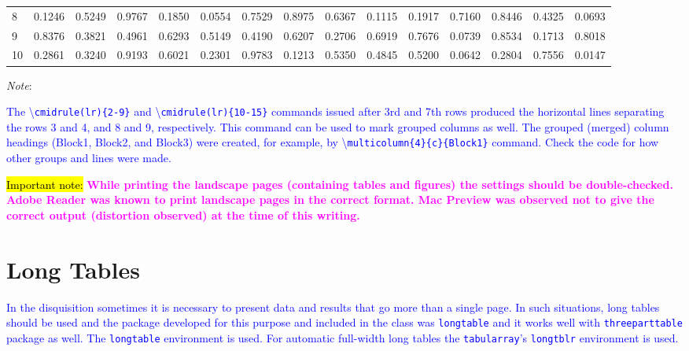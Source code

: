 \documentclass[phd]{ndsu-thesis-2022}
\newcommand\italk[1]{\textcolor{blue}{#1}}  %
\newcommand\cmd[1]{\textbackslash\texttt{#1}}  %
\newcommand\vb[1]{\textcolor{blue}{\texttt{#1}}}%
\begin{document}
\begin{landscape}
\begin{table}[p]
{\begin{tabular}{l  rrrr  cccc  llll  rr}
8 & 0.1246 & 0.5249 & 0.9767 & 0.1850 & 0.0554 & 0.7529 & 0.8975 & 0.6367 & 0.1115 & 0.1917 & 0.7160 & 0.8446 & 0.4325 & 0.0693 \\
\cmidrule(lr){10-15}
9 & 0.8376 & 0.3821 & 0.4961 & 0.6293 & 0.5149 & 0.4190 & 0.6207 & 0.2706 & 0.6919 & 0.7676 & 0.0739 & 0.8534 & 0.1713 & 0.8018 \\
10 & 0.2861 & 0.3240 & 0.9193 & 0.6021 & 0.2301 & 0.9783 & 0.1213 & 0.5350 & 0.4845 & 0.5200 & 0.0642 & 0.2804 & 0.7556 & 0.0147 \\
\bottomrule
\end{tabular}
}    
\begin{tablenotes}[flushleft]
\footnotesize
\item \hspace{-1ex} \emph{Note}: \italk{The \cmd{cmidrule(lr)\{2-9\}} and \cmd{cmidrule(lr)\{10-15\}} commands issued after 3rd and 7th rows produced the horizontal lines separating the rows 3 and 4, and 8 and 9, respectively. This command can be used to mark grouped columns as well. The grouped (merged) column headings (Block1, Block2, and Block3) were created, for example, by \cmd{multicolumn\{4\}\{c\}\{Block1\}} command. Check the code for how other groups and lines were made.
\item \vspace{4ex}
\italk{\hl{Important note:}} \textcolor{magenta}{\bfseries While printing the landscape pages (containing tables and figures) the settings should be double-checked. Adobe Reader was known to print landscape pages in the correct format. Mac Preview was observed not to give the correct output (distortion observed) at the time of this writing.}
}  
\end{tablenotes}  
\label{tab212}
\end{table}
\end{landscape}

\section{Long Tables}
\italk{In the disquisition sometimes it is necessary to present data and results that go more than a single page. In such situations, long tables should be used and the package developed for this purpose and included in the class was 
\vb{longtable} and it works well with \vb{threeparttable} package as well. The \vb{longtable} environment is used. For automatic full-width long tables the \vb{tabularray}'s \vb{longtblr} environment is used.} 
\end{document}
